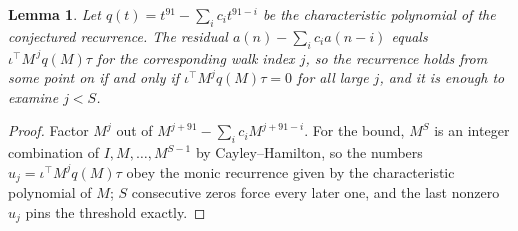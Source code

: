 \documentclass[11pt,a4paper]{article}
\theoremstyle{plain}
\newtheorem{lemma}[theorem]{Lemma}
\theoremstyle{definition}
\begin{document}
\begin{lemma}\label{lem:crit}
Let $q(t)=t^{91}-\sum_i c_it^{91-i}$ be the characteristic polynomial of the
conjectured recurrence. The residual $a(n)-\sum_ic_ia(n-i)$ equals
$\iota^{\!\top}M^{\,j}q(M)\tau$ for the corresponding walk index $j$, so the recurrence
holds from some point on if and only if $\iota^{\!\top}M^{j}q(M)\tau=0$ for all large $j$,
and it is enough to examine $j<S$.
\end{lemma}

\begin{proof}
Factor $M^{j}$ out of $M^{j+91}-\sum_ic_iM^{j+91-i}$. For the bound, $M^{S}$
is an integer combination of $I,M,\dots,M^{S-1}$ by Cayley--Hamilton, so the numbers
$u_j=\iota^{\!\top}M^{j}q(M)\tau$ obey the monic recurrence given by the characteristic
polynomial of $M$; $S$ consecutive zeros force every later one, and the last nonzero $u_j$
pins the threshold exactly.
\end{proof}
\end{document}
